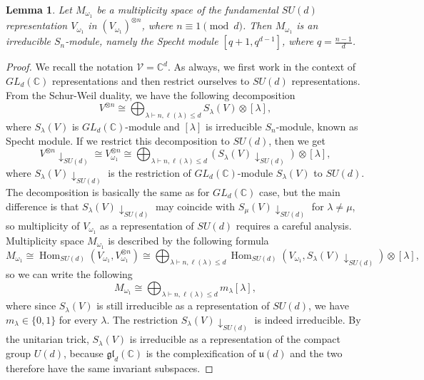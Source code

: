 \documentclass[11pt,letterpaper]{article}
\theoremstyle{plain}
\theoremstyle{plain}
\theoremstyle{plain}
\theoremstyle{plain}
\theoremstyle{plain}
\theoremstyle{plain}
\newcommand{\C}{\mathbb{C}}
\theoremstyle{plain}
\newtheorem{smlemma}[smtheorem]{Lemma}
\theoremstyle{definition}
\theoremstyle{plain}
\begin{document}
\begin{smlemma}\label{lem:M_module_irreducibility}
    Let $M_{\omega_1}$ be a multiplicity space of the fundamental $SU(d)$ representation $V_{\omega_1}$ in $\left(V_{\omega_1}\right)^{\otimes n}$, where $n\equiv 1 \pmod{d}$. 
    Then $M_{\omega_1}$ is an irreducible $S_n$-module, namely the Specht module $[q+1, q^{d-1}]$, where $q=\frac{n-1}{d}$.
\end{smlemma}

\begin{proof}
    We recall the notation $\mathcal{V}=\C^d$. As always, we first work in the context of $GL_d(\mathbb{C})$ representations and then restrict ourselves to $SU(d)$ representations. 
    From the Schur-Weil duality, we have the following decomposition
    \[
        V^{\otimes n} \cong \bigoplus_{\lambda \vdash n, \ell(\lambda) \leq d} S_\lambda(V) \otimes[\lambda],
    \]
    where $S_\lambda(V)$ is $GL_d(\mathbb{C})$-module and $[\lambda]$ is irreducible $S_n$-module, known as Specht module.
    If we restrict this decomposition to $SU(d)$, then we get
    \[
        V^{\otimes n}\downarrow_{SU(d)}\cong V_{\omega_1}^{\otimes n} \cong \bigoplus_{\lambda \vdash n, \ell(\lambda) \leq d}\left(S_\lambda(V) \downarrow_{S U(d)}\right) \otimes[\lambda],
    \]
    where $S_\lambda(V) \downarrow_{S U(d)}$ is the restriction of $GL_d(\mathbb{C})$-module $S_\lambda(V)$ to $SU(d)$. 
    The decomposition is basically the same as for $GL_d(\mathbb{C})$ case, but the main difference
    is that $S_\lambda(V) \downarrow_{S U(d)}$ may coincide with $S_\mu(V) \downarrow_{S U(d)}$ for $\lambda \neq \mu$, 
    so multiplicity of $V_{\omega_1}$ as a representation of $SU(d)$ requires a careful analysis.
    Multiplicity space $M_{\omega_1}$ is described by the following formula
    \[
        M_{\omega_1}\cong \operatorname{Hom}_{S U(d)}\left(V_{\omega_1}, V_{\omega_1}^{\otimes n}\right) 
        \cong \bigoplus_{\lambda \vdash n, \ell(\lambda) \leq d} \operatorname{Hom}_{S U(d)}\left(V_{\omega_1}, S_\lambda(V) \downarrow_{S U(d)}\right) \otimes[\lambda],
    \]
    so we can write the following
    \[
        M_{\omega_1} \cong \bigoplus_{\lambda \vdash n, \ell(\lambda) \leq d} m_\lambda[\lambda],
    \]
    where since $S_\lambda(V)$ is still irreducible as a representation of $SU(d)$, we have $m_{\lambda}\in \{0,1\}$ for every
    $\lambda$.
    The restriction $S_\lambda(V)\downarrow_{SU(d)}$ is indeed irreducible. By the unitarian trick, $S_\lambda(V)$ is irreducible as a representation 
    of the compact group $U(d)$, because $\mathfrak{gl}_d(\C)$ is the complexification of $\mathfrak u(d)$ and the two therefore have the same invariant subspaces. 

\end{proof}
\end{document}
